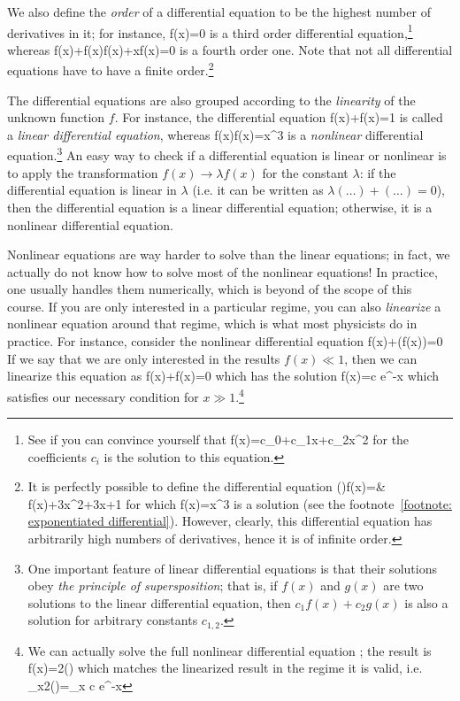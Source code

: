 We also define the \emph{order} of a differential equation to be the highest number of derivatives in it; for instance,
\be 
{}f(x)=0
\ee 
is a third order differential equation,\footnote{
	See if you can convince yourself that 
	\be 
	f(x)=c_0+c_1x+c_2x^2
	\ee 
	for the coefficients $c_i$ is the solution to this equation.
} whereas
\be 
{}f(x)+f(x)f(x)+xf(x)=0
\ee 
is a fourth order one. Note that not all differential equations have to have a finite order.\footnote{
	It is perfectly possible to define the differential equation
	\be 
	\exp()f(x)={}& f(x)+3x^2+3x+1
	\ee 
	for which 
	\be 
	f(x)=x^3
	\ee 
	is a solution (see the footnote~\ref{footnote: exponentiated differential}). However, clearly, this differential equation has arbitrarily high numbers of derivatives, hence it is of infinite order.
}

The differential equations are also grouped according to the \emph{linearity} of the unknown function $f$. For instance, the differential equation
\be 
{}f(x)+f(x)=1
\ee 
is called a \emph{linear differential equation}, whereas
\be 
f(x)f(x)=x^3
\ee 
is a \emph{nonlinear} differential equation.\footnote{\label{footnote:superposition}
	One important feature of linear differential equations is that their solutions obey \emph{the principle of supersposition}; that is, if $f(x)$ and $g(x)$ are two solutions to the linear differential equation, then $c_1f(x)+c_2g(x)$ is also a solution for arbitrary constants $c_{1,2}$.
} An easy way to check if a differential equation is linear or nonlinear is to apply the transformation $f(x)\rightarrow \lambda f(x)$ for the constant $\lambda$: if the differential equation is linear in $\lambda$ (i.e. it can be written as $\lambda(\dots)+(\dots)=0$), then the differential equation is a linear differential equation; otherwise, it is a nonlinear differential equation.

Nonlinear equations are way harder to solve than the linear equations; in fact, we actually do not know how to solve most of the nonlinear equations! In practice, one usually handles them numerically, which is beyond of the scope of this course. If you are only interested in a particular regime, you can also \emph{linearize} a nonlinear equation around that regime, which is what most physicists do in practice. For instance, consider the nonlinear differential equation
\be 
\label{eq: nonlinear example}
f(x)+\sin(f(x))=0
\ee 
If we say that we are only interested in the results $f(x)\ll1$, then we can linearize this equation as 
\be 
{}f(x)+f(x)=0
\ee 
which has the solution
\be 
f(x)=c e^{-x}
\ee 
which satisfies our necessary condition for $x\gg 1$.\footnote{
	We can actually solve the full nonlinear differential equation ; the result is
	\be 
	f(x)=2\arccot()
	\ee 
	which matches the linearized result in the regime it is valid, i.e. 
	\be 
	\lim\limits_{x\rightarrow\infty}2\arccot()=\lim\limits_{x\rightarrow\infty} c e^{-x}
	\ee 
}

